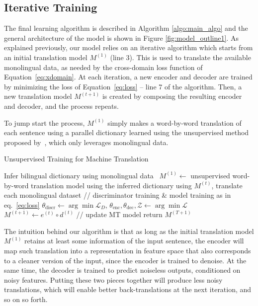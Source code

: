 \documentclass{article} \usepackage{iclr2018_conference,times}
\begin{document}
\subsection{Iterative Training }


The final learning algorithm is described in Algorithm \ref{algo:main_algo} and the general architecture of the model is shown in Figure \ref{fig:model_outline1}. As explained previously, our model relies on an iterative algorithm which starts from an initial translation model $M^{(1)}$ (line 3). This is used to translate the available monolingual data, as needed by the cross-domain loss function of Equation~\ref{eq:xdomain}.
At each iteration, a new encoder and decoder are trained by minimizing the loss of Equation~\ref{eq:loss} -- line 7 of the algorithm. Then, a new translation model $M^{(t+1)}$ is created by composing the resulting encoder and decoder, and the process repeats.

To jump start the process, $M^{(1)}$ simply makes a word-by-word translation of each sentence using a parallel dictionary learned using the unsupervised method proposed by~\citet{wordalign17}, which only leverages monolingual data.

\begin{algorithm}[t] 
\caption{Unsupervised Training for Machine Translation}
\begin{algorithmic}[1]
\State Infer bilingual dictionary using monolingual data~\citep{wordalign17}
\State $M^{(1)} \gets $ unsupervised word-by-word translation model using the inferred dictionary
\State using $M^{(t)}$, translate each monolingual dataset 
\State // discriminator training \& model training as in eq.~\ref{eq:loss}
\State $\theta_\mathrm{discr} \gets  \arg \min  \mathcal{L}_{D}$, \hspace{.2cm} $\theta_\mathrm{enc},\theta_\mathrm{dec},\mathcal{Z} \gets \arg \min  \mathcal{L}$
\State $M^{(t+1)} \gets e^{(t)} \circ d^{(t)}$  // update MT model
\EndFor
\State return $M^{(T+1)}$
\EndProcedure
\end{algorithmic}
\label{algo:main_algo}
\end{algorithm}

The intuition behind our algorithm is that as long as the initial translation model $M^{(1)}$ retains at least some information of the input sentence, the encoder will map such translation into a representation in feature space that also corresponds to a cleaner version of the input, since the encoder is  trained to denoise. At the same time, the decoder is trained to predict noiseless outputs, conditioned on noisy features. Putting these two pieces together will produce less noisy translations, which will enable better back-translations at the next iteration, and so on so forth. 
\end{document}
